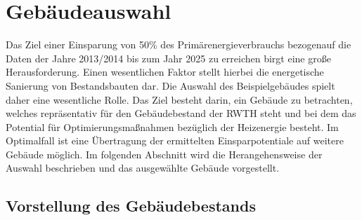 \chapter{Gebäudeauswahl}
\label{cha:Gebäudeauswahl}

Das Ziel einer Einsparung von 50\% des Primärenergieverbrauchs bezogenauf die Daten der Jahre 2013/2014 bis zum Jahr 2025 zu erreichen birgt eine große Herausforderung. Einen wesentlichen Faktor stellt hierbei die energetische Sanierung von Bestandsbauten dar. Die Auswahl des Beispielgebäudes spielt daher eine wesentliche Rolle. Das Ziel besteht darin, ein Gebäude zu betrachten, welches repräsentativ für den Gebäudebestand der RWTH steht und bei dem das Potential für Optimierungsmaßnahmen bezüglich der Heizenergie besteht. Im Optimalfall ist eine Übertragung der ermittelten Einsparpotentiale auf weitere Gebäude möglich. Im folgenden Abschnitt wird die Herangehensweise der Auswahl beschrieben und das ausgewählte Gebäude vorgestellt.
 
\section{Vorstellung des Gebäudebestands}
\label{sec:Vorstellung des Gebäudebestands}

